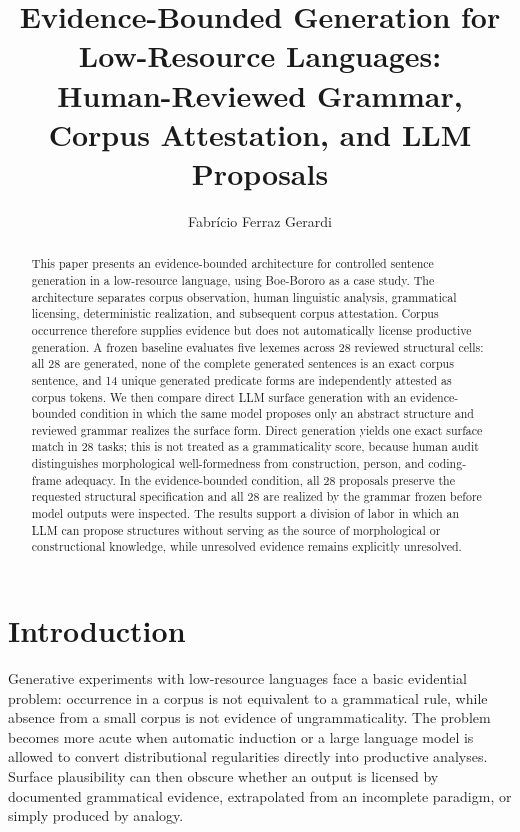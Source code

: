 \documentclass[11pt]{article}
\title{Evidence-Bounded Generation for Low-Resource Languages:\\
Human-Reviewed Grammar, Corpus Attestation, and LLM Proposals}
\author{Fabrício Ferraz Gerardi}
\date{}
\begin{document}
\maketitle

\begin{abstract}
This paper presents an evidence-bounded architecture for controlled sentence
generation in a low-resource language, using Boe-Bororo as a case study. The
architecture separates corpus observation, human linguistic analysis,
grammatical licensing, deterministic realization, and subsequent corpus
attestation. Corpus occurrence therefore supplies evidence but does not
automatically license productive generation. A frozen baseline evaluates five
lexemes across 28 reviewed structural cells: all 28 are generated, none of the
complete generated sentences is an exact corpus sentence, and 14 unique
generated predicate forms are independently attested as corpus tokens. We then
compare direct LLM surface generation with an evidence-bounded condition in
which the same model proposes only an abstract structure and reviewed grammar
realizes the surface form. Direct generation yields one exact surface match in
28 tasks; this is not treated as a grammaticality score, because human audit
distinguishes morphological well-formedness from construction, person, and
coding-frame adequacy. In the evidence-bounded condition, all 28 proposals
preserve the requested structural specification and all 28 are realized by the
grammar frozen before model outputs were inspected. The results support a
division of labor in which an LLM can propose structures without serving as the
source of morphological or constructional knowledge, while unresolved evidence
remains explicitly unresolved.
\end{abstract}

\section{Introduction}

Generative experiments with low-resource languages face a basic evidential
problem: occurrence in a corpus is not equivalent to a grammatical rule, while
absence from a small corpus is not evidence of ungrammaticality. The problem
becomes more acute when automatic induction or a large language model is allowed
to convert distributional regularities directly into productive analyses.
Surface plausibility can then obscure whether an output is licensed by
documented grammatical evidence, extrapolated from an incomplete paradigm, or
simply produced by analogy.
\end{document}
